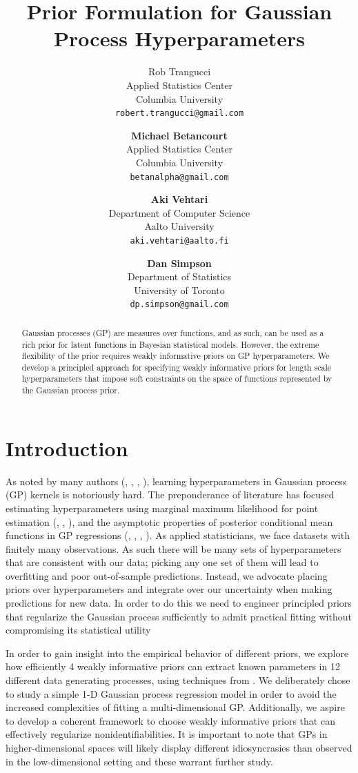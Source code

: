 \documentclass{article}
\title{Prior Formulation for Gaussian Process Hyperparameters}
\author{
  Rob Trangucci \\
  Applied Statistics Center\\
  Columbia University\\
  \texttt{robert.trangucci@gmail.com} 
  \and
  \textbf{Michael Betancourt} \\
  Applied Statistics Center \\
  Columbia University \\
  \texttt{betanalpha@gmail.com} 
  \and
  \textbf{Aki Vehtari} \\
  Department of Computer Science \\
  Aalto University \\
  \texttt{aki.vehtari@aalto.fi} 
  \and
  \textbf{Dan Simpson} \\
  Department of Statistics \\
  University of Toronto \\
  \texttt{dp.simpson@gmail.com} 
}
\begin{document}

\maketitle

\begin{abstract}
  Gaussian processes (GP) are measures over functions, and as such, can be used
  as a rich prior for latent functions in Bayesian statistical models. However,
  the extreme flexibility of the prior requires weakly informative priors on GP
  hyperparameters. We develop a principled approach for specifying weakly
  informative priors for length scale hyperparameters that impose soft
  constraints on the space of functions represented by the Gaussian process
  prior.
\end{abstract}


\section{Introduction}

As noted by many authors (\citet{flaxman2015fast},
\citet{stein2012interpolation}, \citet{rasmussen2005gaussian},
\citet{fuglstad2015interpretable}), learning hyperparameters in Gaussian
process (GP) kernels is notoriously hard. The preponderance of literature has
focused estimating hyperparameters using marginal maximum likelihood for point
estimation (\citet{stein2012interpolation}, \citet{rasmussen2005gaussian},
\citet{warnes1987problems}), and the asymptotic properties of posterior
conditional mean functions in GP regressions (\citet{seeger2008information},
\citet{stein2012interpolation}, \citet{rasmussen2005gaussian},
\citet{williams2000upper}). As applied statisticians, we face datasets with
finitely many observations. As such there will be many sets of hyperparameters
that are consistent with our data; picking any one set of them will lead to
overfitting and poor out-of-sample predictions. Instead, we advocate placing
priors over hyperparameters and integrate over our uncertainty when making
predictions for new data. In order to do this we need to engineer principled
priors that regularize the Gaussian process sufficiently to admit practical
fitting without compromising its statistical utility

In order to gain insight into the empirical behavior of different priors, we
explore how efficiently 4 weakly informative priors can extract known
parameters in 12 different data generating processes, using techniques from
\citet{cook2012validation}. We deliberately chose to study a simple 1-D
Gaussian process regression model in order to avoid the increased complexities
of fitting a multi-dimensional GP.  Additionally, we aspire to develop a
coherent framework to choose weakly informative priors that can effectively
regularize nonidentifiabilities.  It is important to note that GPs in
higher-dimensional spaces will likely display different idiosyncrasies than
observed in the low-dimensional setting and these warrant further study.
\end{document}
